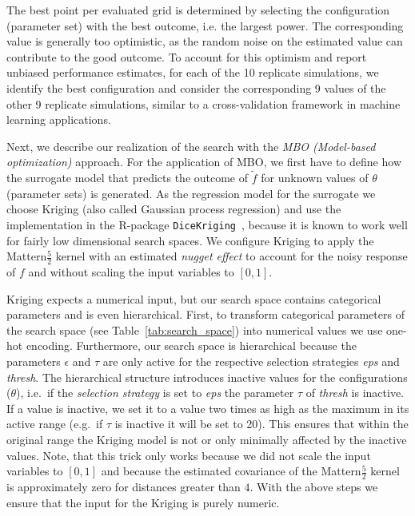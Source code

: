 \documentclass[bimj,fleqn]{w-art}
\theoremstyle{plain}
\theoremstyle{definition}
\begin{document}
The best point per evaluated grid is determined by selecting the configuration (parameter set) with the best outcome, i.e. the largest power.
The corresponding value is generally too optimistic, as the random noise on the estimated value can contribute to the good outcome.
To account for this optimism and report unbiased performance estimates, for each of the 10 replicate simulations, we identify the best configuration and consider the corresponding 9 values of the other 9 replicate simulations, similar to a cross-validation framework in machine learning applications. 

Next, we describe our realization of the search with the \emph{MBO (Model-based optimization)} approach.
For the application of MBO, we first have to define how the surrogate model that predicts the outcome of $\tilde{f}$ for unknown values of $\theta$ (parameter sets) is generated.
As the regression model for the surrogate we choose Kriging (also called Gaussian process regression) and use the implementation in the R-package \texttt{DiceKriging}~\citep{roustant_dicekriging_2012}, because it is known to work well for fairly low dimensional search spaces.
We configure Kriging to apply the Mattern$\frac{5}{2}$ kernel with an estimated \emph{nugget effect} to account for the noisy response of $f$ and without scaling the input variables to $[0,1]$.

Kriging expects a numerical input, but our search space contains categorical parameters and is even hierarchical.
First, to transform categorical parameters of the search space (see Table~\ref{tab:search_space}) into numerical values we use one-hot encoding.
Furthermore, our search space is hierarchical because the parameters $\epsilon$ and $\tau$ are only active for the respective selection strategies \emph{eps} and \emph{thresh}.
The hierarchical structure introduces inactive values for the configurations ($\theta$), i.e.\ if the \emph{selection strategy} is set to \emph{eps} the parameter $\tau$ of \emph{thresh} is inactive.
If a value is inactive, we set it to a value two times as high as the maximum in its active range (e.g.\ if $\tau$ is inactive it will be set to 20).
This ensures that within the original range the Kriging model is not or only minimally affected by the inactive values.
Note, that this trick only works because we did not scale the input variables to $[0,1]$ and because the estimated covariance of the Mattern$\frac{5}{2}$ kernel is approximately zero for distances greater than $4$.
With the above steps we ensure that the input for the Kriging is purely numeric.
\end{document}
